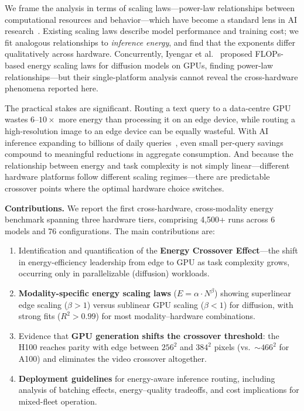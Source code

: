 \documentclass[acmlarge,manuscript,screen,review]{acmart}
\begin{document}
We frame the analysis in terms of scaling laws---power-law relationships between computational resources and behavior---which have become a standard lens in AI research~\cite{kaplan2020scaling}.
Existing scaling laws describe model performance and training cost; we fit analogous relationships to \emph{inference energy}, and find that the exponents differ qualitatively across hardware.
Concurrently, Iyengar et al.~\cite{castano2025energy} proposed FLOPs-based energy scaling laws for diffusion models on GPUs, finding power-law relationships---but their single-platform analysis cannot reveal the cross-hardware phenomena reported here.

The practical stakes are significant.
Routing a text query to a data-centre GPU wastes $6$--$10\times$ more energy than processing it on an edge device, while routing a high-resolution image to an edge device can be equally wasteful.
With AI inference expanding to billions of daily queries~\cite{devries2023growing}, even small per-query savings compound to meaningful reductions in aggregate consumption.
And because the relationship between energy and task complexity is not simply linear---different hardware platforms follow different scaling regimes---there are predictable crossover points where the optimal hardware choice switches.

\textbf{Contributions.}\quad
We report the first cross-hardware, cross-modality energy benchmark spanning three hardware tiers, comprising 4,500+ runs across 6 models and 76 configurations. The main contributions are:
\begin{enumerate}[leftmargin=*]
\item Identification and quantification of the \textbf{Energy Crossover Effect}---the shift in energy-efficiency leadership from edge to GPU as task complexity grows, occurring only in parallelizable (diffusion) workloads.
\item \textbf{Modality-specific energy scaling laws} ($E = \alpha \cdot N^\beta$) showing superlinear edge scaling ($\beta > 1$) versus sublinear GPU scaling ($\beta < 1$) for diffusion, with strong fits ($R^2 > 0.99$) for most modality--hardware combinations.
\item Evidence that \textbf{GPU generation shifts the crossover threshold}: the H100 reaches parity with edge between $256^2$ and $384^2$ pixels (vs.\ ${\sim}466^2$ for A100) and eliminates the video crossover altogether.
\item \textbf{Deployment guidelines} for energy-aware inference routing, including analysis of batching effects, energy--quality tradeoffs, and cost implications for mixed-fleet operation.
\end{enumerate}
\end{document}
